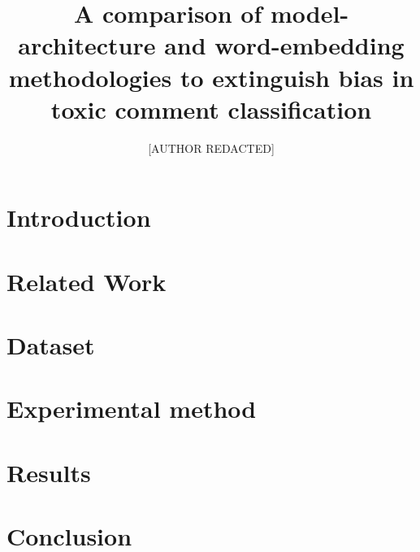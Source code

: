 \documentclass{article}
\title{A comparison of model-architecture and \linebreak word-embedding methodologies to extinguish \linebreak bias in toxic comment classification}
\author{[AUTHOR REDACTED]}
\date{}
\begin{document}
\maketitle

\begin{abstract}

\end{abstract}

\section{Introduction}\label{sec:introduction}


\section{Related Work}\label{sec:related-work}


\section{Dataset}\label{sec:dataset}


\section{Experimental method}\label{sec:experimental-method}


\section{Results}\label{sec:results}


\section{Conclusion}\label{sec:results}


\newpage



\end{document}
